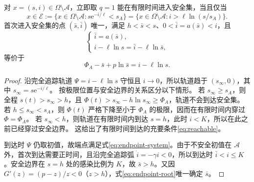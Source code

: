 \documentclass[lang=cn,a4paper,newtx]{elegantpaper}
\theoremstyle{plain}
\theoremstyle{definition}
\newcommand{\Acal}{\mathcal A}
\newcommand{\e}{\mathrm e}
\begin{document}
\begin{proposition}[正感染端点存在的充要条件]
\label{prop:reachable}
对 $x=(s,i)\in\Omega\setminus\Acal$，立即取 $q=1$ 能在有限时间进入安全集，当且仅当
\begin{equation}
x\in\mathcal E:=\{x\in\Omega\setminus\Acal:s\e^{-i/\ell}<s_A\}
=\{x\in\Omega\setminus\Acal:i>\ell\ln(s/s_A)\}.
\label{eq:reachable}
\end{equation}
首次进入安全集的点 $(\bar s,\bar i)$ 唯一，满足 $h<\bar s<s$、$0<\bar i=a(\bar s)<i$，且
\begin{equation}
\begin{cases}
\bar i=a(\bar s),\\ i-\ell\ln s=\bar i-\ell\ln\bar s,
\end{cases}
\label{eq:endpoint-system}
\end{equation}
等价于
\begin{equation}
\Phi_A-\bar s+p\ln\bar s=i-\ell\ln s.
\label{eq:endpoint-root}
\end{equation}
\end{proposition}
\begin{proof}
沿完全追踪轨道 $\Psi=i-\ell\ln s$ 守恒且 $i\to0$，所以轨道趋于 $(s_\infty,0)$，其中 $s_\infty=s\e^{-i/\ell}$。
按极限位置与安全边界的关系区分以下情形。
若 $s_\infty\ge s_A$，则全程 $s(t)>s_\infty>h$，且 $\Phi(t)>s_\infty-h\ln s_\infty\ge\Phi_A$，轨道不会到达安全集。
若 $h\le s_\infty<s_A$，则 $\Phi(t)$ 严格下降至小于 $\Phi_A$ 的极限，因而在有限时间内穿过 $\Phi=\Phi_A$。
若 $s_\infty<h$，则轨道在有限时间内到达 $s=h$，此时 $i<K$，所以在此之前已经穿过安全边界。
这给出了有限时间到达的充要条件\eqref{eq:reachable}。

到达时 $\Psi$ 仍取初值，故端点满足式\eqref{eq:endpoint-system}。由于不安全初值在 $\Acal$ 外，首次到达需要正时间，且沿完全追踪弧 $\dot i=-\gamma i<0$，所以到达时 $\bar i<i\le K$。安全边界在 $s=h$ 处的感染比例为 $K$，故 $\bar s>h$。又因 $G'(z)=(p-z)/z<0$（$z>h$），式\eqref{eq:endpoint-root}唯一确定 $\bar s$。
\end{proof}
\end{document}
